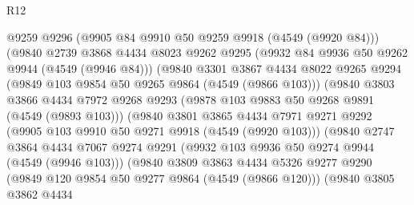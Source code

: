 \begin{lexlean}{R12}
\begin{coremodule}
                            @9259
                            @9296
                            (@9905 @84 @9910 @50 @9259 @9918 (@4549 (@9920 @84)))
                            (@9840
                              @2739
                              @3868
                              @4434
                              @8023
                              @9262
                              @9295
                              (@9932 @84 @9936 @50 @9262 @9944 (@4549 (@9946 @84)))
                              (@9840
                                @3301
                                @3867
                                @4434
                                @8022
                                @9265
                                @9294
                                (@9849 @103 @9854 @50 @9265 @9864 (@4549 (@9866 @103)))
                                (@9840
                                  @3803
                                  @3866
                                  @4434
                                  @7972
                                  @9268
                                  @9293
                                  (@9878 @103 @9883 @50 @9268 @9891 (@4549 (@9893 @103)))
                                  (@9840
                                    @3801
                                    @3865
                                    @4434
                                    @7971
                                    @9271
                                    @9292
                                    (@9905 @103 @9910 @50 @9271 @9918 (@4549 (@9920 @103)))
                                    (@9840
                                      @2747
                                      @3864
                                      @4434
                                      @7067
                                      @9274
                                      @9291
                                      (@9932 @103 @9936 @50 @9274 @9944 (@4549 (@9946 @103)))
                                      (@9840
                                        @3809
                                        @3863
                                        @4434
                                        @5326
                                        @9277
                                        @9290
                                        (@9849 @120 @9854 @50 @9277 @9864 (@4549 (@9866 @120)))
                                        (@9840
                                          @3805
                                          @3862
                                          @4434

\end{coremodule}
\end{lexlean}
